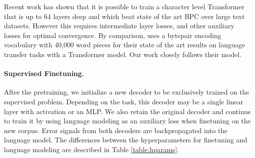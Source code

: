 \documentclass[letterpaper]{article} \usepackage{aaai19}  \usepackage{times}  \usepackage{helvet}  \usepackage{courier}  \usepackage{url}  \usepackage{graphicx}  \usepackage{booktabs}
\begin{document}
Recent work \protect\cite{DeepXformer2018} has shown that it is possible to train a character level Transformer that is up to 64 layers deep and which beat state of the art BPC over large text datasets. However this requires intermediate layer losses, and other auxiliary losses for optimal convergence. By comparison, \protect\cite{Radford2018} uses a bytepair encoding vocabulary with 40,000 word pieces for their state of the art results on language transfer tasks with a Transformer model. Our work closely follows their model. 



\paragraph{Supervised Finetuning.}
After the pretraining, we initialize a new decoder  to be exclusively trained on the supervised problem. Depending on the task, this decoder may be a single linear layer with activation or an MLP. We also retain the original decoder  and continue to train it by using language modeling as an auxiliary loss when finetuning on the new corpus. Error signals from both decoders are backpropagated into the language model. The differences between the hyperparameters for finetuning and language modeling are described in Table \ref{table:hparams}.

\begin{table}[!t]
\caption{Hyperparameters for language modeling and finetuning phases.}
\label{table:hparams}
\end{table}
\end{document}
